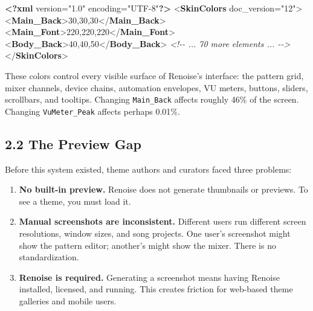 \documentclass[
  11pt,
  oneside]{report}
\newenvironment{Shaded}{\begin{snugshade}}{\end{snugshade}}
\newcommand{\CommentTok}[1]{\textcolor[rgb]{0.56,0.35,0.01}{\textit{#1}}}
\newcommand{\FunctionTok}[1]{\textcolor[rgb]{0.13,0.29,0.53}{\textbf{#1}}}
\newcommand{\KeywordTok}[1]{\textcolor[rgb]{0.13,0.29,0.53}{\textbf{#1}}}
\newcommand{\NormalTok}[1]{#1}
\newcommand{\OtherTok}[1]{\textcolor[rgb]{0.56,0.35,0.01}{#1}}
\newcommand{\StringTok}[1]{\textcolor[rgb]{0.31,0.60,0.02}{#1}}
\providecommand{\tightlist}{%
  \setlength{\itemsep}{0pt}\setlength{\parskip}{0pt}}
\begin{document}
\begin{Shaded}
\begin{Highlighting}[]
\FunctionTok{\textless{}?xml}\OtherTok{ version=}\StringTok{"1.0"}\OtherTok{ encoding=}\StringTok{"UTF{-}8"}\FunctionTok{?\textgreater{}}
\NormalTok{\textless{}}\KeywordTok{SkinColors}\OtherTok{ doc\_version=}\StringTok{"12"}\NormalTok{\textgreater{}}
\NormalTok{  \textless{}}\KeywordTok{Main\_Back}\NormalTok{\textgreater{}30,30,30\textless{}/}\KeywordTok{Main\_Back}\NormalTok{\textgreater{}}
\NormalTok{  \textless{}}\KeywordTok{Main\_Font}\NormalTok{\textgreater{}220,220,220\textless{}/}\KeywordTok{Main\_Font}\NormalTok{\textgreater{}}
\NormalTok{  \textless{}}\KeywordTok{Body\_Back}\NormalTok{\textgreater{}40,40,50\textless{}/}\KeywordTok{Body\_Back}\NormalTok{\textgreater{}}
  \CommentTok{\textless{}!{-}{-} ... 70 more elements ... {-}{-}\textgreater{}}
\NormalTok{\textless{}/}\KeywordTok{SkinColors}\NormalTok{\textgreater{}}
\end{Highlighting}
\end{Shaded}

These colors control every visible surface of Renoise's interface: the
pattern grid, mixer channels, device chains, automation envelopes, VU
meters, buttons, sliders, scrollbars, and tooltips. Changing
\texttt{Main\_Back} affects roughly 46\% of the screen. Changing
\texttt{VuMeter\_Peak} affects perhaps 0.01\%.

\subsection{2.2 The Preview Gap}\label{the-preview-gap}

Before this system existed, theme authors and curators faced three
problems:

\begin{enumerate}
\def\labelenumi{\arabic{enumi}.}
\tightlist
\item
  \textbf{No built-in preview.} Renoise does not generate thumbnails or
  previews. To see a theme, you must load it.
\item
  \textbf{Manual screenshots are inconsistent.} Different users run
  different screen resolutions, window sizes, and song projects. One
  user's screenshot might show the pattern editor; another's might show
  the mixer. There is no standardization.
\item
  \textbf{Renoise is required.} Generating a screenshot means having
  Renoise installed, licensed, and running. This creates friction for
  web-based theme galleries and mobile users.
\end{enumerate}
\end{document}
